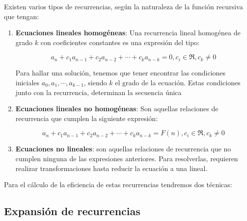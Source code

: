 \documentclass[10pt,a4paper,spanish]{report}
\theoremstyle{definition}
\theoremstyle{remark}
\begin{document}
    Existen varios tipos de recurrencias, según la naturaleza de la función recursiva que tengan:

    \begin{enumerate}[$\spadesuit$]
        \item \textbf{\textcolor{YellowOrange}Ecuaciones lineales homogéneas}: Una recurrencia lineal homogénea de grado $k$ con coeficientes constantes es una expresión del tipo:

        \begin{displaymath}
            a_n + c_1a_{n-1} + c_2a_{n-2} + \cdots + c_ka_{n-k} = 0, c_i \in \Re, c_k \neq 0
        \end{displaymath}

        Para hallar una solución, tenemos que tener encontrar las condiciones iniciales $a_0, a_1, \cdots, a_{k-1}$, siendo $k$ el grado de la ecuación. Estas condiciones junto con la recurrencia, determinan la secuencia única

        \item \textbf{\textcolor{YellowOrange}Ecuaciones lineales no homogéneas}: Son aquellas relaciones de recurrencia que cumplen la siguiente expresión:

        \begin{displaymath}
            a_n + c_1a_{n-1} + c_2a_{n-2} + \cdots + c_ka_{n-k} = F(n), c_i \in \Re, c_k \neq 0
        \end{displaymath}

        \item \textbf{\textcolor{YellowOrange}Ecuaciones no lineales}: son aquellas relaciones de recurrencia que no cumplen ninguna de las expresiones anteriores. Para resolverlas, requieren realizar transformaciones hasta reducir la ecuación a una lineal.
    \end{enumerate}

    Para el cálculo de la eficiencia de estas recurrencias tendremos dos técnicas:

    \subsection{\textcolor{YellowOrange}Expansión de recurrencias}
\end{document}
